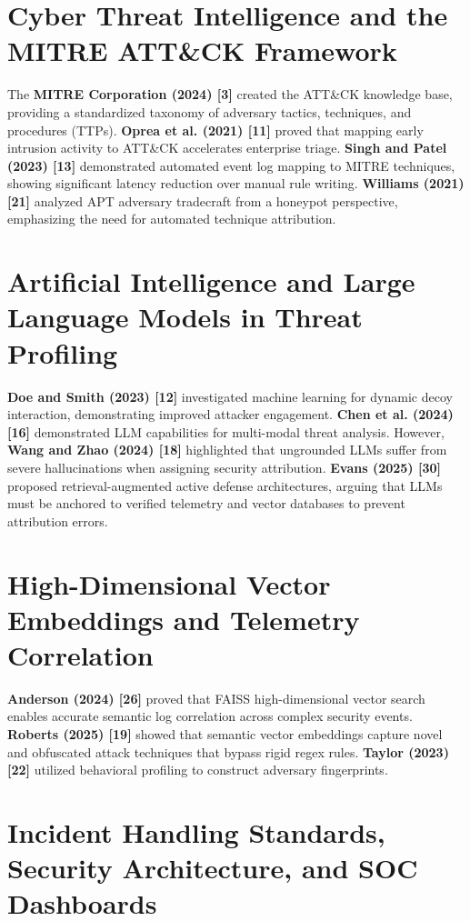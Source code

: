 \documentclass[12pt,a4paper]{report}
\begin{document}
\section{Cyber Threat Intelligence and the MITRE ATT\&CK Framework}

The \textbf{MITRE Corporation (2024) [3]} created the ATT\&CK knowledge base, providing a standardized taxonomy of adversary tactics, techniques, and procedures (TTPs). \textbf{Oprea et al. (2021) [11]} proved that mapping early intrusion activity to ATT\&CK accelerates enterprise triage. \textbf{Singh and Patel (2023) [13]} demonstrated automated event log mapping to MITRE techniques, showing significant latency reduction over manual rule writing. \textbf{Williams (2021) [21]} analyzed APT adversary tradecraft from a honeypot perspective, emphasizing the need for automated technique attribution.

\section{Artificial Intelligence and Large Language Models in Threat Profiling}

\textbf{Doe and Smith (2023) [12]} investigated machine learning for dynamic decoy interaction, demonstrating improved attacker engagement. \textbf{Chen et al. (2024) [16]} demonstrated LLM capabilities for multi-modal threat analysis. However, \textbf{Wang and Zhao (2024) [18]} highlighted that ungrounded LLMs suffer from severe hallucinations when assigning security attribution. \textbf{Evans (2025) [30]} proposed retrieval-augmented active defense architectures, arguing that LLMs must be anchored to verified telemetry and vector databases to prevent attribution errors.

\section{High-Dimensional Vector Embeddings and Telemetry Correlation}

\textbf{Anderson (2024) [26]} proved that FAISS high-dimensional vector search enables accurate semantic log correlation across complex security events. \textbf{Roberts (2025) [19]} showed that semantic vector embeddings capture novel and obfuscated attack techniques that bypass rigid regex rules. \textbf{Taylor (2023) [22]} utilized behavioral profiling to construct adversary fingerprints.

\section{Incident Handling Standards, Security Architecture, and SOC Dashboards}
\end{document}
